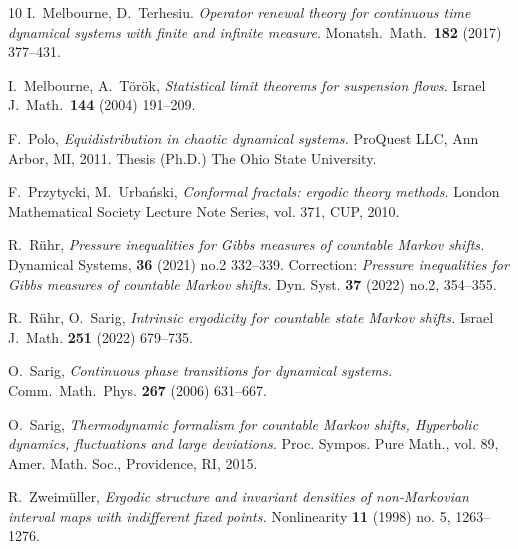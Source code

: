 \documentclass[12pt]{article}
\numberwithin{equation}{section}
\begin{document}
\begin{thebibliography}{10}
 I.\ Melbourne, D.\ Terhesiu. 
\emph{Operator renewal theory for continuous time dynamical systems with finite and infinite measure}. 
Monatsh.\ Math.\  \textbf{182} (2017) 377--431.

I.~Melbourne, A.~T{\" o}r{\" o}k,
\emph{Statistical limit theorems for suspension flows}.
Israel J.\ Math.\  \textbf{144} (2004) 191--209.

  F.\ Polo, \emph{Equidistribution in chaotic dynamical systems.}
ProQuest LLC, Ann Arbor, MI, 2011. Thesis (Ph.D.) The Ohio State University.

 F.\ Przytycki, M.\ Urba\'nski,
\emph{Conformal fractals: ergodic theory methods.}
London Mathematical Society Lecture Note Series, vol. 371, CUP, 2010.

 R.\ R\"uhr, \emph{Pressure inequalities for Gibbs measures of countable Markov shifts.} Dynamical Systems, \textbf{36}  (2021) no.2 332--339.  Correction: \emph{Pressure inequalities for Gibbs measures of countable Markov shifts.} Dyn. Syst. \textbf{37} (2022) no.2, 354--355.

 R.\ R\"uhr, O.\ Sarig, 
\emph{Intrinsic ergodicity for countable state Markov shifts.}
 Israel J.\ Math. \textbf{251} (2022) 679--735.

 O.\ Sarig, \emph{Continuous phase transitions for dynamical systems.}
Comm.\ Math.\ Phys. \textbf{267} (2006) 631--667.

 O.\ Sarig,
 \emph{Thermodynamic formalism for countable Markov shifts, Hyperbolic dynamics, fluctuations and large deviations.}
 Proc. Sympos. Pure Math., vol. 89, Amer. Math. Soc., Providence, RI, 2015.

 R.\ Zweim\"uller, \emph{Ergodic structure and invariant densities of non-Markovian interval maps with indifferent fixed points.} Nonlinearity \textbf{11} (1998) no. 5, 1263--1276.

\end{thebibliography}
\end{document}
